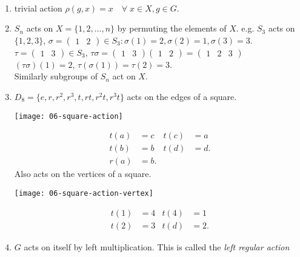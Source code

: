 \begin{example} \label{exm:actions} ~\vspace*{-1.5\baselineskip}
    \begin{enumerate} \def\labelenumi{\roman{enumi}.} \def\labelenumii{\arabic{enumii}.} 
        \item trivial action $\rho(g, x) = x \quad \forall \; x \in X, g \in G$.
        \item $S_n$ acts on $X = \{ 1, 2, \dots, n \}$ by permuting the elements of $X$.
        e.g. $S_3$ acts on $\{1, 2, 3\}$, $\sigma = \begin{pmatrix}1 & 2\end{pmatrix} \in S_3 : \sigma(1) = 2, \sigma(2) = 1, \sigma(3) = 3$.
        $\tau = \begin{pmatrix}1 & 3\end{pmatrix} \in S_3$, $\tau \sigma = \begin{pmatrix}1 & 3\end{pmatrix} \begin{pmatrix}1 & 2\end{pmatrix} = \begin{pmatrix}1 & 2 & 3\end{pmatrix}$ \\
        $(\tau \sigma)(1) = 2$, $\tau(\sigma(1)) = \tau(2) = 3$. \\
        Similarly subgroups of $S_n$ act on $X$.
        \item $D_8 = \{e, r, r^2, r^3, t, rt, r^2t, r^3t \}$ acts on the edges of a square.
        {\centering
        \texttt{[image: 06-square-action]}
        \par}
        \begin{align*}
            t(a) &= c & t(c) &= a \\
            t(b) &= b & t(d) &= d. \\
            r(a) &= b.
        \end{align*} 
        Also acts on the vertices of a square.
        {\par \centering \texttt{[image: 06-square-action-vertex]} \par}
        \begin{align*}
            t(1) &= 4 & t(4) &= 1 \\
            t(2) &= 3 & t(d) &= 2.
        \end{align*} 
        \item $G$ acts on itself by left multiplication.
        This is called the \emph{left regular action}

\end{enumerate}
\end{example}
